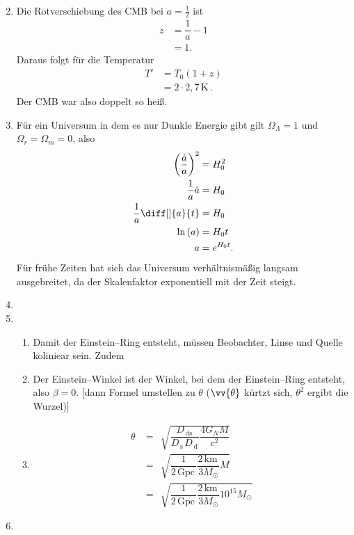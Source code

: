 \documentclass[a4paper,12pt]{article}
\numberwithin{equation}{section}
\begin{document}
\begin{enumerate}[label=\arabic*.]
\begin{align*}
                \end{align*} 
        \item Die Rotverschiebung des CMB bei $a=\tfrac{1}{2}$ ist
                \begin{align*} 
                        z&=\dfrac{1}{a}-1\\
                         &=1
                .\end{align*} 
                Daraus folgt für die Temperatur
                \begin{align*} 
                        T'&=T_0\left(1+z\right)\\
                          &=2\cdot 2,7\,\text{K}\,
                .\end{align*} 
                Der CMB war also doppelt so heiß.
        \item Für ein Universum in dem es nur Dunkle Energie gibt gilt $\Omega _\Lambda =1$ und $\Omega _r=\Omega _m=0$, also
                \begin{align*} 
                        \left(\dfrac{\dot{a}}{a}\right)^2&=H_0^2\\
                        \dfrac{1}{a}\dot{a}&=H_0\\
                        \dfrac{1}{a}\diff[]{a}{t}&=H_0\\
                        \ln\left(a\right)&=H_0t\\
                        a&=e ^{H_0t}
                .\end{align*} 
                Für frühe Zeiten hat sich das Universum verhältnismäßig langsam ausgebreitet, da der Skalenfaktor exponentiell mit der Zeit steigt.
        \item 
        \item \begin{enumerate}[label=\alph*)]
                \item Damit der Einstein--Ring entsteht, müssen Beobachter, Linse und Quelle koliniear sein. Zudem
                \item Der Einstein--Winkel ist der Winkel, bei dem der Einstein--Ring entsteht, also $\beta =0$. [dann Formel umstellen zu $\theta $ ($\vv{\theta }$ kürtzt sich, $\theta ^2$ ergibt die Wurzel)]
                \item \begin{align*} 
                                \theta &=\,\sqrt[]{\dfrac{D_{\,\text{ds}\,}}{D_{\,\text{s}\,}D_{\,\text{d}\,}}\dfrac{4G_NM}{c^2}}\\
                                       &=\,\sqrt[]{\dfrac{1}{2\,\text{Gpc}\,}\dfrac{2\,\text{km}\,}{3M_\odot}M}\\
                                       &=\,\sqrt[]{\dfrac{1}{2\,\text{Gpc}\,}\dfrac{2\,\text{km}\,}{3M_\odot}10^{15}M_\odot}
                \end{align*} 
        \end{enumerate}
        \item 
\end{enumerate}
\end{document}
